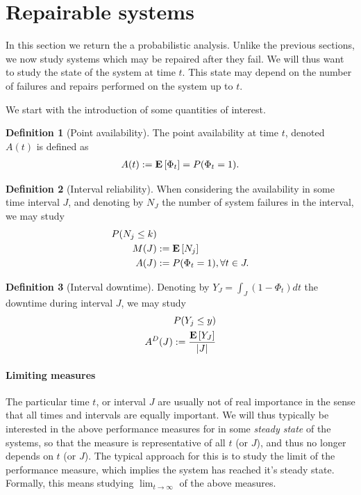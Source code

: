 \documentclass[12pt,a4paper]{report}
\theoremstyle{plain}
\theoremstyle{definition}
\newtheorem{definition}{Definition}
\begin{document}
\section{Repairable systems}
In this section we return the a probabilistic analysis.
Unlike the previous sections, we now study systems which may be repaired after they fail.
We will thus want to study the state of the system at time $t$.
This state may depend on the number of failures and repairs performed on the system up to $t$.

We start with the introduction of some quantities of interest.
\begin{definition}[Point availability]
The point availability at time $t$, denoted $A(t)$ is defined as 
\begin{align}
	A(t):= \mathbf{E}\left[ \Phi_t \right]=P(\Phi_t=1) .
\end{align}
\end{definition}

\begin{definition}[Interval reliability]
When considering the availability in some time interval $J$, and denoting by $N_J$ the number of system failures in the interval, we may study
\begin{align}
	P(N_j\leq k) &\\
	M(J) &:= \mathbf{E}\left[ N_j \right] \\
	A(J) &:= P(\Phi_t=1), \forall t \in J.
\end{align}
\end{definition}


\begin{definition}[Interval downtime]
Denoting by $Y_J=\int_J (1-\Phi_t) dt$ the downtime during interval $J$, we may study
\begin{align}
	P(Y_j \leq y) &	\\
	A^D(J) := \frac{\mathbf{E}\left[ Y_J \right]}{|J|}
\end{align}
\end{definition}

\paragraph{Limiting measures} The particular time $t$, or interval $J$ are usually not of real importance in the sense that all times and intervals are equally important.
We will thus typically be interested in the above performance measures for in some \emph{steady state} of the systems, so that the measure is representative of all $t$ (or $J$), and thus no longer depends on $t$ (or $J$).
The typical approach for this is to study the limit of the performance measure, which implies the system has reached it's steady state. Formally, this means studying $\lim_{t \to \infty}$ of the above measures. 
\end{document}
